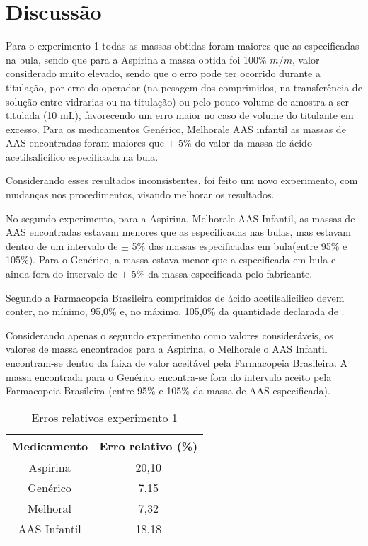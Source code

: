 \chapter{Discussão}

Para o experimento 1 todas as massas obtidas foram maiores que as especificadas na bula, sendo que
para a Aspirina\R \; a massa obtida foi 100\% $m/m$, valor considerado muito elevado, sendo que o
erro pode ter ocorrido durante a titulação, por erro do operador (na pesagem dos comprimidos, na
transferência de solução entre vidrarias ou na titulação) ou pelo pouco volume de amostra a ser
titulada (10 mL), favorecendo um erro maior no caso de volume do titulante em excesso. Para os
medicamentos Genérico, Melhoral\R e AAS infantil as massas de AAS encontradas foram maiores que
$\pm$ 5\% do valor da massa de ácido acetilsalicílico especificada na bula.

Considerando esses resultados inconsistentes, foi feito um novo experimento, com mudanças nos
procedimentos, visando melhorar os resultados.

 No segundo experimento, para a Aspirina\R, Melhoral\R e AAS Infantil, as massas de AAS encontradas
 estavam menores que as especificadas nas bulas, mas estavam dentro de um intervalo de $\pm$ 5\% das
 massas especificadas em bula(entre 95\% e 105\%). Para o Genérico, a massa estava menor que a
 especificada em bula e ainda fora do intervalo de $\pm$ 5\% da massa especificada pelo fabricante.

 Segundo a Farmacopeia Brasileira \cite{Farmacopeia2010} comprimidos de ácido acetilsalicílico devem
 conter, no mínimo, 95,0\% e, no máximo, 105,0\% da quantidade declarada de .

 Considerando apenas o segundo experimento como valores consideráveis, os valores de massa
 encontrados para a Aspirina\R, o Melhoral\R e o AAS Infantil encontram-se dentro da faixa de valor
 aceitável pela Farmacopeia Brasileira. A massa encontrada para o Genérico encontra-se fora do
 intervalo aceito pela Farmacopeia Brasileira (entre 95\% e 105\% da massa de AAS especificada).

 \begin{table}[H]\label{err_exp1}
     \centering
\begin{tabular}{c c}
    \toprule
    \textbf{Medicamento} & \textbf{Erro relativo (\%)} \\
    \midrule
    Aspirina\R & 20,10 \\
    Genérico & 7,15 \\
    Melhoral\R & 7,32 \\
    AAS Infantil & 18,18\\
    \bottomrule
\end{tabular}
\caption{Erros relativos experimento 1}
 \end{table}

